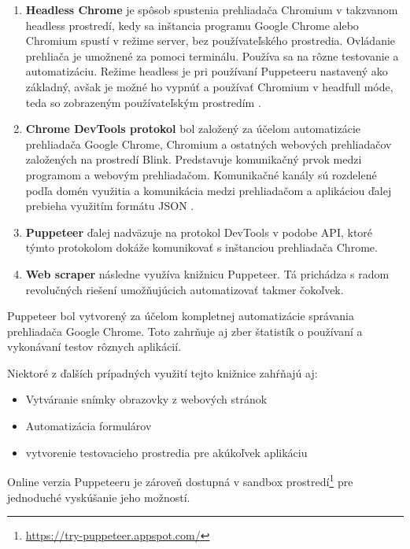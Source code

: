 \begin{enumerate}
  \item \textbf{Headless Chrome} je spôsob spustenia prehliadača Chromium v takzvanom headless prostredí, kedy sa inštancia programu Google Chrome alebo Chromium spustí v režime server, bez používateľského prostredia. Ovládanie prehliača je umožnené za pomoci terminálu. Používa sa na rôzne testovanie a automatizáciu. Režime headless je pri používaní Puppeteeru nastavený ako základný, avšak je možné ho vypnúť a používať Chromium v headfull móde, teda so zobrazeným používateľským prostredím \cite{chromium}.
  \item \textbf{Chrome DevTools protokol} bol založený za účelom automatizácie prehliadača Google Chrome, Chromium a ostatných webových prehliadačov založených na prostredí Blink. Predstavuje komunikačný prvok medzi programom a webovým prehliadačom. Komunikačné kanály sú rozdelené podľa domén využitia a komunikácia medzi prehliadačom a aplikáciou ďalej prebieha využitím formátu JSON \cite{devtools}.
  \item \textbf{Puppeteer} ďalej nadväzuje na protokol DevTools v podobe API, ktoré týmto protokolom dokáže komunikovať s inštanciou prehliadača Chrome. 
  \item \textbf{Web scraper} následne využíva knižnicu Puppeteer. Tá prichádza s radom revolučných riešení umožňujúcich automatizovať takmer čokoľvek.
\end{enumerate}

\newpage

Puppeteer bol vytvorený za účelom kompletnej automatizácie správania prehliadača Google Chrome. Toto zahrňuje aj zber štatistík o používaní a vykonávaní testov rôznych aplikácií.

Niektoré z ďalších prípadných využití tejto knižnice zahŕňajú aj:\cite{puppeteer}
\begin{itemize}
    \item {Vytváranie snímky obrazovky z webových stránok}
    \item {Automatizácia formulárov}
    \item {vytvorenie testovacieho prostredia pre akúkoľvek aplikáciu}
\end{itemize}

\bigskip

Online verzia Puppeteeru je zároveň dostupná v sandbox prostredí\footnote{\url{https://try-puppeteer.appspot.com/}} pre jednoduché vyskúšanie jeho možností.

\bigskip

